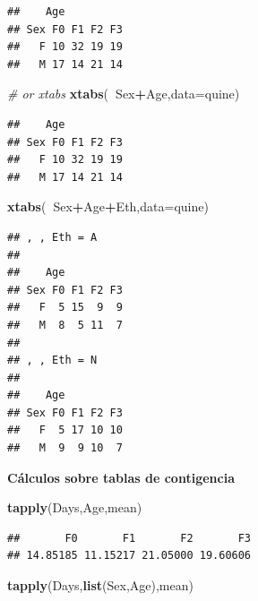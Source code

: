 \documentclass[]{book}
\newenvironment{Shaded}{\begin{snugshade}}{\end{snugshade}}
\newcommand{\KeywordTok}[1]{\textcolor[rgb]{0.13,0.29,0.53}{\textbf{#1}}}
\newcommand{\DataTypeTok}[1]{\textcolor[rgb]{0.13,0.29,0.53}{#1}}
\newcommand{\CommentTok}[1]{\textcolor[rgb]{0.56,0.35,0.01}{\textit{#1}}}
\newcommand{\OperatorTok}[1]{\textcolor[rgb]{0.81,0.36,0.00}{\textbf{#1}}}
\newcommand{\NormalTok}[1]{#1}
\begin{document}
\begin{verbatim}
##    Age
## Sex F0 F1 F2 F3
##   F 10 32 19 19
##   M 17 14 21 14
\end{verbatim}

\begin{Shaded}
\begin{Highlighting}[]
\CommentTok{# or xtabs}
\KeywordTok{xtabs}\NormalTok{(}\OperatorTok{~}\NormalTok{Sex}\OperatorTok{+}\NormalTok{Age,}\DataTypeTok{data=}\NormalTok{quine)}
\end{Highlighting}
\end{Shaded}

\begin{verbatim}
##    Age
## Sex F0 F1 F2 F3
##   F 10 32 19 19
##   M 17 14 21 14
\end{verbatim}

\begin{Shaded}
\begin{Highlighting}[]
\KeywordTok{xtabs}\NormalTok{(}\OperatorTok{~}\NormalTok{Sex}\OperatorTok{+}\NormalTok{Age}\OperatorTok{+}\NormalTok{Eth,}\DataTypeTok{data=}\NormalTok{quine)}
\end{Highlighting}
\end{Shaded}

\begin{verbatim}
## , , Eth = A
## 
##    Age
## Sex F0 F1 F2 F3
##   F  5 15  9  9
##   M  8  5 11  7
## 
## , , Eth = N
## 
##    Age
## Sex F0 F1 F2 F3
##   F  5 17 10 10
##   M  9  9 10  7
\end{verbatim}

\textbf{Cálculos sobre tablas de contigencia}

\begin{Shaded}
\begin{Highlighting}[]
\KeywordTok{tapply}\NormalTok{(Days,Age,mean)}
\end{Highlighting}
\end{Shaded}

\begin{verbatim}
##       F0       F1       F2       F3 
## 14.85185 11.15217 21.05000 19.60606
\end{verbatim}

\begin{Shaded}
\begin{Highlighting}[]
\KeywordTok{tapply}\NormalTok{(Days,}\KeywordTok{list}\NormalTok{(Sex,Age),mean)}
\end{Highlighting}
\end{Shaded}
\end{document}

